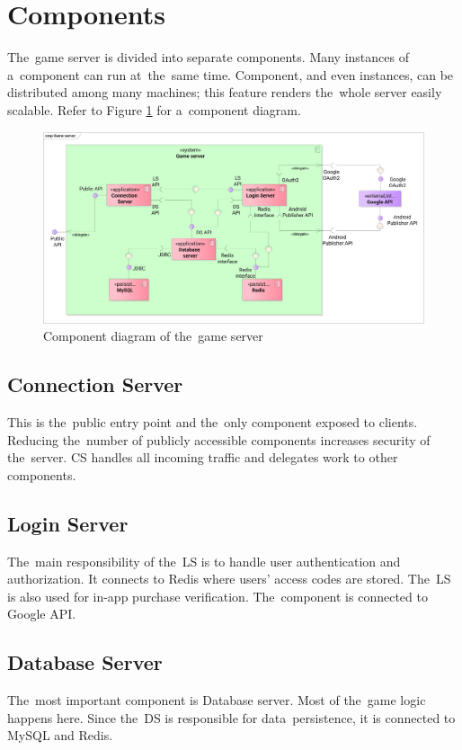 \section{Components}
The~game server is divided into separate components. Many instances of a~component can run at~the~same time. Component, and even instances, can be distributed among many machines; this feature renders the~whole server easily scalable. Refer to Figure \ref{fig:components} for a~component diagram.

\begin{figure}[h]	
	\includegraphics[width=\textwidth]{figures/Components}
	\centering			
	\caption{Component diagram of the~game server}
	\label{fig:components}
\end{figure}

	\subsection{Connection Server}
	This is the~public entry point and the~only component exposed to clients. Reducing the~number of publicly accessible components increases security of the~server. CS handles all incoming traffic and delegates work to other components. 
	
	\subsection{Login Server}
	The~main responsibility of the~LS is to handle user authentication and authorization. It connects to Redis where users' access codes are stored. The~LS is also used for in-app purchase verification. The~component is connected to Google API.
	
	\subsection{Database Server}
	The~most important component is Database server. Most of the~game logic happens here. Since the~DS is responsible for data~persistence, it is connected to MySQL and Redis.

